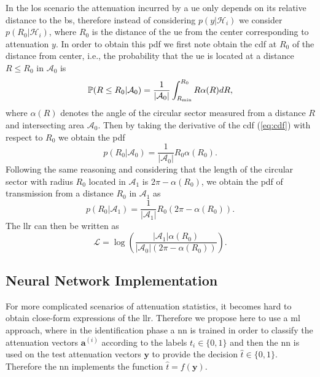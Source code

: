\documentclass[conference]{IEEEtran}
\begin{document}
In the \ac{los} scenario the attenuation incurred by a \ac{ue} only depends on its relative distance to the \ac{bs}, therefore instead of considering $p(y|\mathcal H_i)$ we consider $p(R_0|\mathcal H_i)$, where $R_0$ is the distance of the \ac{ue} from the center corresponding to attenuation $y$. In order to obtain this \ac{pdf} we first note obtain the \ac{cdf} at $R_0$ of the distance from center, i.e.,  the probability that the \ac{ue} is located at a distance $R\le R_0$ in $\mathcal{A}_0$ is
\begin{equation}\label{eq:cdf}
     \mathbb{P}(R \le R_0|\mathcal{A}_0) = \frac{1}{|\mathcal{A}_0|}\int_{R_{\rm min}}^{R_0} R \alpha(R) dR,
\end{equation}
where $\alpha(R)$ denotes the angle of the circular sector measured from a distance $R$ and intersecting area $\mathcal{A}_0$. Then by taking the derivative of the \ac{cdf} (\ref{eq:cdf}) with respect to $R_0$ we obtain the \ac{pdf} 
\begin{equation}
    p(R_0|\mathcal{A}_0) = \frac{1}{|\mathcal{A}_0|}R_0\alpha(R_0).
\end{equation}
Following the same reasoning and considering that the length of the circular sector with radius $R_0$ located in $\mathcal{A}_1$ is $2\pi - \alpha(R_0)$, we obtain the \ac{pdf} of transmission from a distance $R_0$ in $\mathcal{A}_1$ as
\begin{equation}
     p(R_0|\mathcal{A}_1) = \frac{1}{|\mathcal{A}_1|}R_0\left(2\pi-\alpha(R_0)\right).
\end{equation}
The \ac{llr} can then be written as 
\begin{equation}
    \mathcal{L}=\log\left(\frac{|\mathcal{A}_1|\alpha(R_0)}{|\mathcal{A}_0|\left(2\pi-\alpha(R_0)\right)}\right).
\end{equation}

\subsection{Neural Network Implementation}\label{sec:nn}

For more complicated scenarios of attenuation statistics, it becomes hard to obtain close-form expressions of the \ac{llr}. Therefore we propose here to use a \ac{ml} approach, where in the identification phase a \ac{nn} is trained in order to classify the attenuation vectors $\bm{a}^{(i)}$ according to the labels $t_i \in \{0,1\}$ and then the \ac{nn} is used on the test attenuation vectors $\bm{y}$ to provide the decision $\hat{t} \in \{0,1\}$. Therefore the \ac{nn} implements the function $\hat{t} = f(\bm{y})$.
\end{document}
